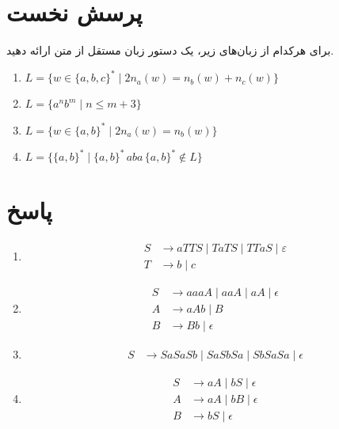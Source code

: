 \section*{پرسش نخست}


برای هرکدام از زبان‌های زیر، یک دستور زبان مستقل از متن ارائه دهید.
\begin{enumerate}
	\item  \(L = \{ w \in \{a, b, c\}^* \mid 2n_a(w) = n_b(w) + n_c(w) \} \) 
	\item \(L = \{ a^n b^m \mid n \leq m + 3 \} \) 
	\item \(L = \{ w \in \{a, b\}^* \mid 2n_a(w) = n_b(w) \} \) 
	\item \(L = \{ \{a, b\}^* \mid \{a, b\}^* \, aba \, \{a, b\}^* \notin L \} \) 
\end{enumerate}


\section*{پاسخ}




\begin{enumerate}
	\item \[
	\begin{aligned}
		S &\rightarrow a T T S \mid T a T S \mid T T a S \mid \varepsilon \\
		T &\rightarrow b \mid c
	\end{aligned}
	\]
	
	\item \[
	\begin{aligned}
		S &\rightarrow aaaA \mid aaA \mid aA \mid\epsilon \\
		A &\rightarrow aAb \mid B \\
		B &\rightarrow Bb \mid \epsilon
	\end{aligned}
	\]
	
	\item \[
	\begin{aligned}
		S &\rightarrow SaSaSb \mid SaSbSa \mid SbSaSa \mid \epsilon
	\end{aligned}
	\]
	
	\item \[
	\begin{aligned}
		S &\rightarrow aA \mid bS \mid \epsilon \\
		A &\rightarrow aA \mid bB \mid \epsilon \\
		B &\rightarrow bS \mid \epsilon
	\end{aligned}
	\]
	
	
\end{enumerate}


